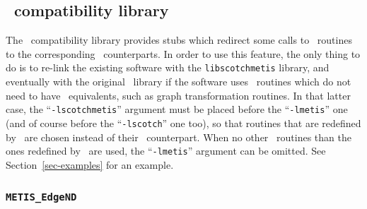 \subsection{\metis\ compatibility library}
\label{sec-lib-metis}

The \metis\ compatibility library provides stubs which redirect some
calls to \metis\ routines to the corresponding \scotch\ counterparts.
In order to use this feature, the only thing to do is to re-link the
existing software with the {\tt lib\lbo scotch\lbo metis} library, and
eventually with the original \metis\ library if the software uses
\metis\ routines which do not need to have \scotch\ equivalents, such
as graph transformation routines.
In that latter case, the ``{\tt -lscotch\lbt metis}'' argument must be
placed before the ``{\tt -lmetis}'' one (and of course before the
``{\tt -lscotch}'' one too), so that routines that are redefined by
\scotch\ are chosen instead of their \metis\ counterpart. When no
other \metis\ routines than the ones redefined by \scotch\ are used,
the ``{\tt -lmetis}'' argument can be omitted. See
Section~\ref{sec-examples} for an example.

\subsubsection{{\tt METIS\_EdgeND}}

